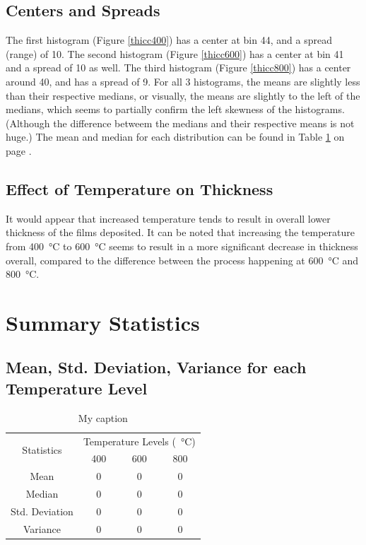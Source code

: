 \documentclass[letterpaper]{article}
\begin{document}
\subsection{Centers and Spreads}
The first histogram (Figure \ref{thicc400}) has a center at bin 44, and a spread (range) of 10.
The second histogram (Figure \ref{thicc600}) has a center at bin 41 and a spread of 10 as well.
The third histogram (Figure \ref{thicc800}) has a center around 40, and has a spread of 9.
For all 3 histograms, the means are slightly less than their respective medians, or visually,
the means are slightly to the left of the medians, which seems to partially confirm
the left skewness of the histograms. (Although the difference betweem the medians and their
respective means is not huge.) The mean and median for each distribution can be found in Table \ref{tempmean}
on page \pageref{tempmean}.


\subsection{Effect of Temperature on Thickness}
It would appear that increased temperature tends to result in overall lower thickness
of the films deposited. It can be noted that increasing the temperature from
\SI{400}{\celsius} to \SI{600}{\celsius} seems to result in a more significant decrease
in thickness overall, compared to the difference between the process happening at
\SI{600}{\celsius} and \SI{800}{\celsius}.

\section{Summary Statistics}

\subsection{Mean, Std. Deviation, Variance for each Temperature Level}

\begin{table}[H]
 \centering
 \begin{tabular}{c|c|c|c|}
  \multirow{2}{*}{Statistics} & \multicolumn{3}{c|}{Temperature Levels (\SI{}{\celsius})}             \\ \cline{2-4}
                              & 400                                                       & 600 & 800 \\ \hline
  Mean                        & 0                                                         & 0   & 0   \\ \hline
  Median                      & 0                                                         & 0   & 0   \\ \hline
  Std. Deviation              & 0                                                         & 0   & 0   \\ \hline
  Variance                    & 0                                                         & 0   & 0   \\ \hline
 \end{tabular}
 \caption{My caption}
 \label{tempmean}
\end{table}
\end{document}
